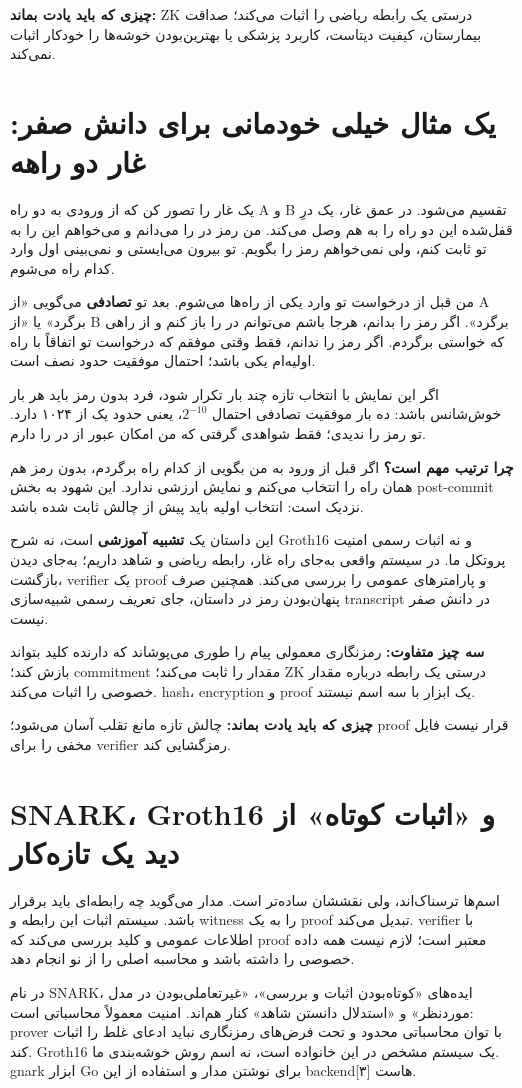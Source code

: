 \documentclass[11pt,a4paper]{article}
\newcommand{\lesson}[1]{\clearpage\section{#1}}
\newcommand{\takeaway}[1]{\par\textbf{چیزی که باید یادت بماند:} #1\par}
\begin{document}
\takeaway{ZK درستی یک رابطه ریاضی را اثبات می‌کند؛ صداقت بیمارستان، کیفیت دیتاست، کاربرد پزشکی یا بهترین‌بودن خوشه‌ها را خودکار اثبات نمی‌کند.}

\lesson{یک مثال خیلی خودمانی برای دانش صفر: غار دو راهه}
یک غار را تصور کن که از ورودی به دو راه A و B تقسیم می‌شود. در عمق غار، یک درِ قفل‌شده این دو راه را به هم وصل می‌کند. من رمز در را می‌دانم و می‌خواهم این را به تو ثابت کنم، ولی نمی‌خواهم رمز را بگویم. تو بیرون می‌ایستی و نمی‌بینی اول وارد کدام راه می‌شوم.

من قبل از درخواست تو وارد یکی از راه‌ها می‌شوم. بعد تو \textbf{تصادفی} می‌گویی «از A برگرد» یا «از B برگرد». اگر رمز را بدانم، هرجا باشم می‌توانم در را باز کنم و از راهی که خواستی برگردم. اگر رمز را ندانم، فقط وقتی موفقم که درخواست تو اتفاقاً با راه اولیه‌ام یکی باشد؛ احتمال موفقیت حدود نصف است.

اگر این نمایش با انتخاب تازه چند بار تکرار شود، فرد بدون رمز باید هر بار خوش‌شانس باشد: ده بار موفقیت تصادفی احتمال \(2^{-10}\)، یعنی حدود یک از ۱۰۲۴ دارد. تو رمز را ندیدی؛ فقط شواهدی گرفتی که من امکان عبور از در را دارم.

\textbf{چرا ترتیب مهم است؟} اگر قبل از ورود به من بگویی از کدام راه برگردم، بدون رمز هم همان راه را انتخاب می‌کنم و نمایش ارزشی ندارد. این شهود به بخش post-commit نزدیک است: انتخاب اولیه باید پیش از چالش ثابت شده باشد.

این داستان یک \textbf{تشبیه آموزشی} است، نه شرح Groth16 و نه اثبات رسمی امنیت پروتکل ما. در سیستم واقعی به‌جای راه غار، رابطه ریاضی و شاهد داریم؛ به‌جای دیدن بازگشت، verifier یک proof و پارامترهای عمومی را بررسی می‌کند. همچنین صرف پنهان‌بودن رمز در داستان، جای تعریف رسمی شبیه‌سازی transcript در دانش صفر نیست.

\textbf{سه چیز متفاوت:} رمزنگاری معمولی پیام را طوری می‌پوشاند که دارنده کلید بتواند بازش کند؛ commitment مقدار را ثابت می‌کند؛ ZK درستی یک رابطه درباره مقدار خصوصی را اثبات می‌کند. hash، encryption و proof یک ابزار با سه اسم نیستند.

\takeaway{چالش تازه مانع تقلب آسان می‌شود؛ proof قرار نیست فایل مخفی را برای verifier رمزگشایی کند.}

\lesson{SNARK، Groth16 و «اثبات کوتاه» از دید یک تازه‌کار}
اسم‌ها ترسناک‌اند، ولی نقششان ساده‌تر است. مدار می‌گوید چه رابطه‌ای باید برقرار باشد. سیستم اثبات این رابطه و witness را به یک proof تبدیل می‌کند. verifier با اطلاعات عمومی و کلید بررسی می‌کند که proof معتبر است؛ لازم نیست همه داده خصوصی را داشته باشد و محاسبه اصلی را از نو انجام دهد.

در نام SNARK، ایده‌های «کوتاه‌بودن اثبات و بررسی»، «غیرتعاملی‌بودن در مدل موردنظر» و «استدلال دانستن شاهد» کنار هم‌اند. امنیت معمولاً محاسباتی است: prover با توان محاسباتی محدود و تحت فرض‌های رمزنگاری نباید ادعای غلط را اثبات کند. Groth16 یک سیستم مشخص در این خانواده است، نه اسم روش خوشه‌بندی ما. gnark ابزار Go برای نوشتن مدار و استفاده از این backendهاست [۳].
\end{document}
